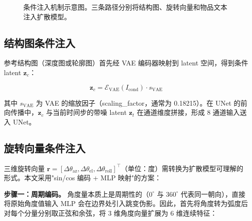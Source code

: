 \begin{figure}[H]
{%
    }
    \caption{条件注入机制示意图。三条路径分别将结构图、旋转向量和物品文本注入扩散模型。}
    \label{fig:condition_injection}
\end{figure}

\subsection{结构图条件注入}

参考结构图（深度图或轮廓图）首先经 VAE 编码器映射到 latent 空间，得到条件 latent $\mathbf{z}_c$：

\begin{equation}
    \mathbf{z}_c = \mathcal{E}_{\text{VAE}}(I_{\text{cond}}) \cdot s_{\text{VAE}}
\end{equation}

其中 $s_{\text{VAE}}$ 为 VAE 的缩放因子（scaling\_factor，通常为 0.18215）。在 UNet 的前向传播中，$\mathbf{z}_c$ 与当前时间步的带噪 latent $\mathbf{z}_t$ 在通道维度拼接，形成 8 通道输入送入 UNet。

\subsection{旋转向量条件注入}

三维旋转向量 $\mathbf{r} = [\Delta\theta_{\text{az}}, \Delta\theta_{\text{el}}, \Delta\theta_{\text{roll}}]^\top$（单位：度）需转换为扩散模型可理解的形式。本文采用"sin/cos 编码 + MLP 映射"的方案：

\textbf{步骤一：周期编码。} 角度量本质上是周期性的（$0^\circ$ 与 $360^\circ$ 代表同一朝向），直接将原始角度值输入 MLP 会在边界处引入跳变伪影。因此，首先将角度转为弧度后对每个分量分别取正弦和余弦，将 3 维角度向量扩展为 6 维连续特征：

